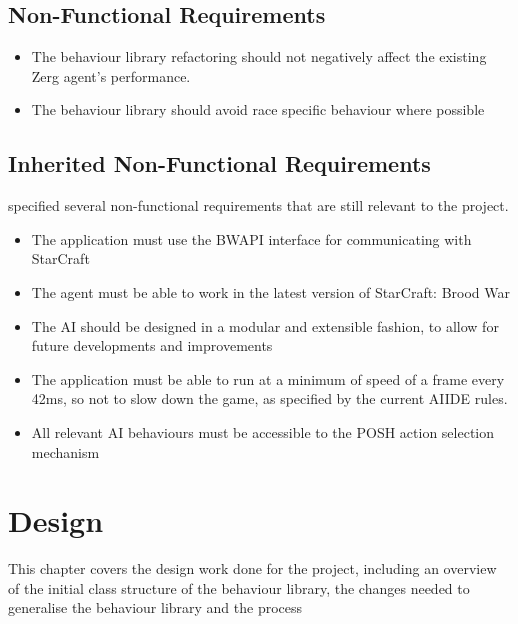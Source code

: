 \documentclass[11pt,openright,a4paper]{report}
\begin{document}
\section{Non-Functional Requirements}
\begin{itemize}
\item{The behaviour library refactoring should not negatively affect the existing Zerg agent's performance.}
\item{The behaviour library should avoid race specific behaviour where possible}
\end{itemize}

\section{Inherited Non-Functional Requirements}
 specified several non-functional requirements that are still relevant to the project.
\begin{itemize}
\item{The application must use the BWAPI interface for communicating with StarCraft}
\item{The agent must be able to work in the latest version of StarCraft: Brood War}
\item{The AI should be designed in a modular and extensible fashion, to allow for future developments and improvements}
\item{The application must be able to run at a minimum of speed of a frame every 42ms, so not to slow down the game, as specified by the current AIIDE rules.}
\item{All relevant AI behaviours must be accessible to the POSH action selection mechanism}
\end{itemize}


\chapter{Design}
This chapter covers the design work done for the project, including an overview of the initial class structure of the behaviour library, the changes needed to generalise the behaviour library and the process
\end{document}
